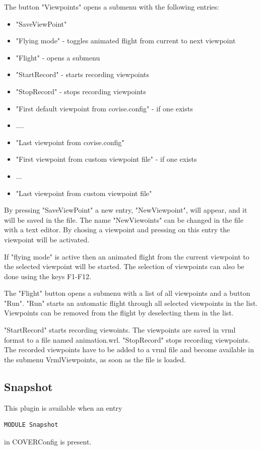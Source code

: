 The button "Viewpoints" opens a submenu with the following entries:
\begin {itemize}
\item "SaveViewPoint"
\item "Flying mode" - toggles animated flight from current to next viewpoint
\item "Flight" - opens a submenu
\item "StartRecord" - starts recording viewpoints
\item "StopRecord" - stops recording viewpoints
\item "First default viewpoint from covise.config" - if one exists
\item   ....
\item "Last viewpoint from covise.config"
\item "First viewpoint from custom viewpoint file" - if one exists
\item  ...
\item "Last viewpoint from custom viewpoint file"
\end {itemize}
By pressing "SaveViewPoint" a new entry, "NewViewpoint", will appear, and
it will be saved in the file. The name "NewViewoints" can be changed in the
file with a text editor.
By chosing a viewpoint and pressing on this entry the viewpoint will be
activated. 

If "flying mode" is active then an animated flight from the
current viewpoint to the selected viewpoint will be started. The selection of viewpoints
can also be done using the keys F1-F12.

The "Flight" button opens a submenu with a list of all viewpoints and
a button "Run". "Run" starts an automatic flight through all selected 
viewpoints in the list. Viewpoints can be removed from the flight by deselecting them 
in the list.

"StartRecord" starts recording viewoints. The viewpoints are saved in vrml
format to a file named animation.wrl. "StopRecord" stops recording viewpoints.
The recorded viewpoints have to be added to a vrml file and become available
in the submenu VrmlViewpoints, as soon as the file is loaded.

\subsection{Snapshot}

This plugin is available when an entry
\begin{verbatim}
MODULE Snapshot
\end{verbatim}
in COVERConfig is present.

